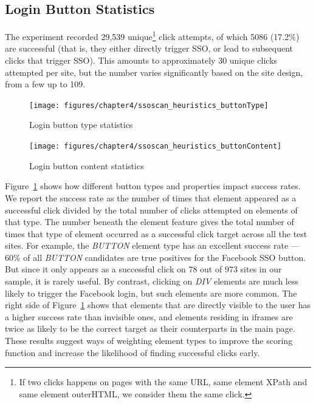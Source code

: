 \subsection{Login Button Statistics}
\label{sec:ssoscan_heuristics_loginButtonStat}

The experiment recorded 29,539 unique\footnote{If two clicks happens on pages with the same URL, same element XPath and same element outerHTML, we consider them the same click.} click attempts, of which 5086 (17.2\%) are successful (that is, they either directly trigger SSO, or lead to subsequent clicks that trigger SSO).  This amounts to approximately 30 unique clicks attempted per site, but the number varies significantly based on the site design, from a few up to 109.

\begin{figure}[htb]
\centering
\texttt{[image: figures/chapter4/ssoscan\_heuristics\_buttonType]}
\caption{Login button type statistics}
\label{fig:ssoscan_heuristics_buttonType}
\end{figure}

\begin{figure}[htb]
\centering
\texttt{[image: figures/chapter4/ssoscan\_heuristics\_buttonContent]}
\caption{Login button content statistics}
\label{fig:ssoscan_heuristics_buttonContent}
\end{figure}

 Figure~\ref{fig:ssoscan_heuristics_buttonType} shows how different button types and properties impact success rates.  We report the success rate as the number of times that element appeared as a successful click divided by the total number of clicks attempted on elements of that type.  The number beneath the element feature gives the total number of times that type of element occurred as a successful click target across all the test sites.  For example, the \emph{BUTTON} element type has an excellent success rate --- 60\% of all \emph{BUTTON} candidates are true positives for the Facebook SSO button.  But since it only appears as a successful click on 78 out of 973 sites in our sample, it is rarely useful.  By contrast, clicking on \emph{DIV} elements are much less likely to trigger the Facebook login, but such elements are more common.  The right side of Figure~\ref{fig:ssoscan_heuristics_buttonType} shows that elements that are directly visible to the user has a higher success rate than invisible ones, and elements residing in iframes are twice as likely to be the correct target as their counterparts in the main page.  These results suggest ways of weighting element types to improve the scoring function and increase the likelihood of finding successful clicks early.

